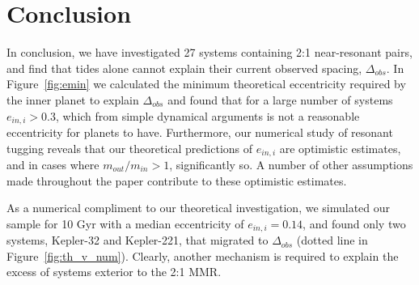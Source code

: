 \section{Conclusion}
\label{sec:Conclusion}
In conclusion, we have investigated 27 \kep{} systems containing 2:1 near-resonant pairs, and find that tides alone cannot explain their current observed spacing, $\Delta_{obs}$. 
In Figure~\ref{fig:emin} we calculated the minimum theoretical eccentricity required by the inner planet to explain $\Delta_{obs}$ and found that for a large number of systems $e_{in,i} > 0.3$, which from simple dynamical arguments is not a reasonable eccentricity for \kep{} planets to have.
Furthermore, our numerical study of resonant tugging reveals that our theoretical predictions of $e_{in,i}$ are optimistic estimates, and in cases where $m_{out}/m_{in} > 1$, significantly so.
A number of other assumptions made throughout the paper contribute to these optimistic estimates.

As a numerical compliment to our theoretical investigation, we simulated our \kep{} sample for 10 Gyr with a median eccentricity of $e_{in,i} = 0.14$, and found only two systems, Kepler-32 and Kepler-221, that migrated to $\Delta_{obs}$ (dotted line in Figure~\ref{fig:th_v_num}).
Clearly, another mechanism is required to explain the excess of \kep{} systems exterior to the 2:1 MMR. 
